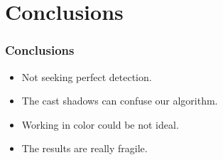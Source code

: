 \documentclass{beamer}
\begin{document}
\section{Conclusions}
\begin{frame}
    \frametitle{Conclusions}
    \begin{itemize}
        \item Not seeking perfect detection.
        \item The cast shadows can confuse our algorithm.
        \item Working in color could be not ideal.
        \item The results are really fragile.
    \end{itemize}
\end{frame}
\end{document}
